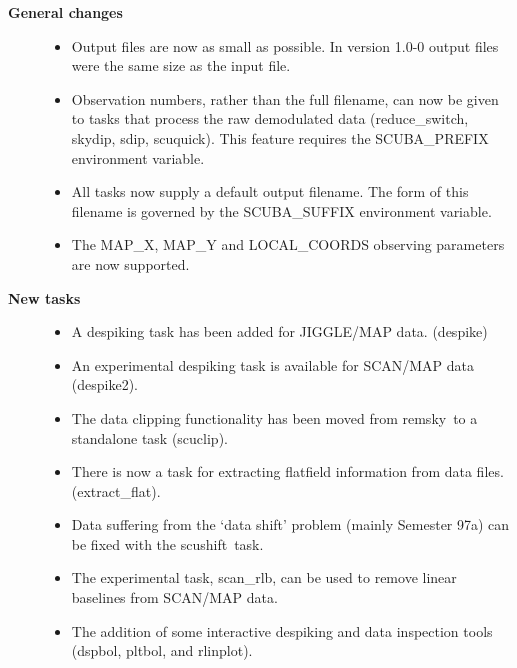 \documentclass[twoside,11pt]{article}
\newcommand{\task}[1]{{\sf #1}}
\newcommand{\resw}{\htmlref{\task{reduce\_switch}}{REDUCE_SWITCH}}
\newcommand{\skydip}{\htmlref{\task{skydip}}{SKYDIP}}
\newcommand{\scuquick}{\htmlref{\task{scuquick}}{SCUQUICK}}
\newcommand{\remsky}{\htmlref{\task{remsky}}{REMSKY}}
\newcommand{\sdip}{\htmlref{\task{sdip}}{SDIP}}
\newcommand{\despike}{\htmlref{\task{despike}}{DESPIKE}}
\newcommand{\despikeb}{\htmlref{\task{despike2}}{DESPIKE2}}
\newcommand{\extflat}{\htmlref{\task{extract\_flat}}{EXTRACT_FLAT}}
\newcommand{\scushift}{\htmlref{\task{scushift}}{SCUSHIFT}}
\newcommand{\scuclip}{\htmlref{\task{scuclip}}{SCUCLIP}}
\newcommand{\scanrlb}{\htmlref{\task{scan\_rlb}}{SCAN_RLB}}
\newcommand{\dspbol}{\htmlref{\task{dspbol}}{DSPBOL}}
\newcommand{\pltbol}{\htmlref{\task{pltbol}}{PLTBOL}}
\newcommand{\rlinplot}{\htmlref{\task{rlinplot}}{RLINPLOT}}
\newcommand{\htmlref}[2]{#1}
\begin{document}
\begin{description}

\item[\textbf{General changes}] \mbox{}

\begin{itemize}
\item Output files are now as small as possible. In version 1.0-0 output files 
were the same size as the input file.

\item Observation numbers, rather than the full filename, can now be given to
 tasks that process the raw demodulated data (\resw, \skydip, \sdip,
 \scuquick). This feature requires the SCUBA\_PREFIX environment variable.

\item All tasks now supply a default output filename. The form of this
filename is governed by the SCUBA\_SUFFIX environment variable.

\item The MAP\_X, MAP\_Y and LOCAL\_COORDS observing parameters are now
supported. 

\end{itemize}


\item[\textbf{New tasks}] \mbox{}

\begin{itemize}

\item A despiking task has been added for JIGGLE/MAP data. (\despike)

\item An experimental despiking task is available for SCAN/MAP data
(\despikeb). 

\item The data clipping functionality has been moved from \remsky\ to a
standalone task (\scuclip).

\item There is now a task for extracting flatfield information from data
files. (\extflat).

\item Data suffering from the `data shift' problem (mainly Semester 97a)
can be fixed with the \scushift\ task.

\item The experimental task, \scanrlb, can be used to remove linear baselines
from SCAN/MAP data.

\item The addition of some interactive despiking and data inspection tools
(\dspbol, \pltbol, and \rlinplot).


\end{itemize}
\end{description}
\end{document}
